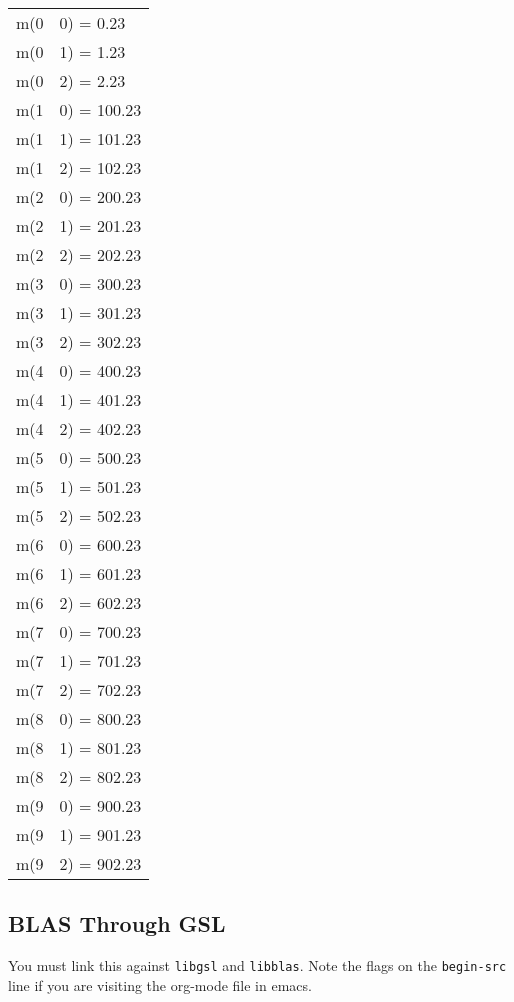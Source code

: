 \documentclass[10pt,oneside,x11names]{article}
\begin{document}
\begin{center}
\begin{tabular}{ll}
m(0 & 0) = 0.23\\
m(0 & 1) = 1.23\\
m(0 & 2) = 2.23\\
m(1 & 0) = 100.23\\
m(1 & 1) = 101.23\\
m(1 & 2) = 102.23\\
m(2 & 0) = 200.23\\
m(2 & 1) = 201.23\\
m(2 & 2) = 202.23\\
m(3 & 0) = 300.23\\
m(3 & 1) = 301.23\\
m(3 & 2) = 302.23\\
m(4 & 0) = 400.23\\
m(4 & 1) = 401.23\\
m(4 & 2) = 402.23\\
m(5 & 0) = 500.23\\
m(5 & 1) = 501.23\\
m(5 & 2) = 502.23\\
m(6 & 0) = 600.23\\
m(6 & 1) = 601.23\\
m(6 & 2) = 602.23\\
m(7 & 0) = 700.23\\
m(7 & 1) = 701.23\\
m(7 & 2) = 702.23\\
m(8 & 0) = 800.23\\
m(8 & 1) = 801.23\\
m(8 & 2) = 802.23\\
m(9 & 0) = 900.23\\
m(9 & 1) = 901.23\\
m(9 & 2) = 902.23\\
\end{tabular}
\end{center}

\subsection{BLAS Through GSL}
\label{sec:orgheadline17}

You must link this against \texttt{libgsl} and \texttt{libblas}. Note the flags on the
\texttt{begin-src} line if you are visiting the org-mode file in emacs.
\end{document}
